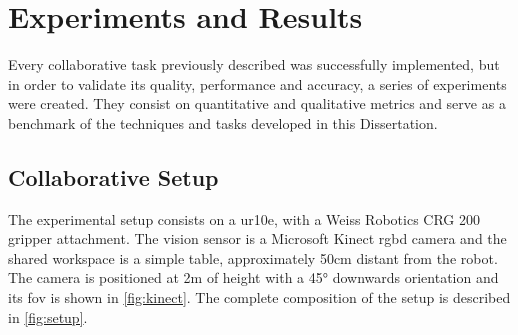 \chapter{Experiments and Results}

\par Every collaborative task previously described was successfully implemented, but in order to validate its quality, performance and accuracy, a series of experiments were created. They consist on quantitative and qualitative metrics and serve as a benchmark of the techniques and tasks developed in this Dissertation.

\section{Collaborative Setup}

\par The experimental setup consists on a \ac{ur10e}, with a Weiss Robotics CRG 200 gripper attachment. The vision sensor is a Microsoft Kinect \acs{rgbd} camera and the shared workspace is a simple table, approximately 50cm distant from the robot. The camera is positioned at 2m of height with a \ang{45} downwards orientation and its \ac{fov} is shown in \autoref{fig:kinect}. The complete composition of the setup is described in \autoref{fig:setup}.

